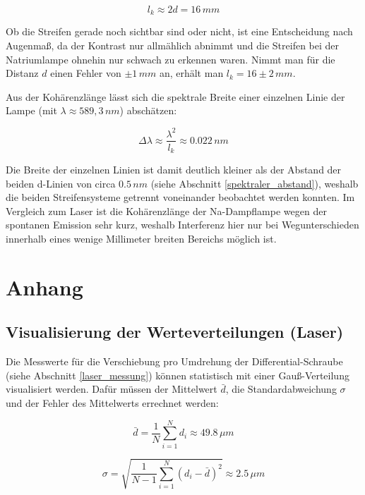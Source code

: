 \documentclass[
  headings=optiontotocandhead,
  twoside,
  openright,
  numbers=noenddot,
  toc=flat,
  11pt,
  parskip=full,
  listof=flat,
  bibliography=totoc,
  a4paper,
  DIV=14,
  BCOR=22mm,
  headheight=5mm,
  headinclude=true,
]{scrartcl}
\begin{document}
\begin{equation}
\label{eq:4.5.1}
l_k \approx 2d = 16 \, mm
\end{equation}
 
Ob die Streifen gerade noch sichtbar sind oder nicht, ist eine Entscheidung nach Augenmaß, da der Kontrast nur allmählich abnimmt und die Streifen bei der Natriumlampe ohnehin nur schwach zu erkennen waren. Nimmt man für die Distanz $d$ einen Fehler von $\pm 1 \,mm$ an, erhält man $l_k = 16 \pm 2 \,mm$.
 
Aus der Kohärenzlänge lässt sich die spektrale Breite einer einzelnen Linie der Lampe (mit $\lambda \approx 589{,}3 \,nm$) abschätzen:
 
\begin{equation}
\label{eq:4.5.2}
\Delta \lambda \approx \frac{\lambda^2}{l_k} \approx 0.022 \, nm
\end{equation}

Die Breite der einzelnen Linien ist damit deutlich kleiner als der Abstand der beiden d-Linien von circa $0.5 \,nm$ (siehe Abschnitt \ref{spektraler_abstand}), weshalb die beiden Streifensysteme getrennt voneinander beobachtet werden konnten. Im Vergleich zum Laser ist die Kohärenzlänge der Na-Dampflampe wegen der spontanen Emission sehr kurz, weshalb Interferenz hier nur bei Wegunterschieden innerhalb eines wenige Millimeter breiten Bereichs möglich ist.

\section{Anhang}

\subsection{Visualisierung der Werteverteilungen (Laser)} \label{gauss_visualisation}

Die Messwerte für die Verschiebung pro Umdrehung der Differential-Schraube (siehe Abschnitt \ref{laser_messung}) können statistisch mit einer Gauß-Verteilung visualisiert werden. Dafür müssen der Mittelwert $\bar{d}$, die Standardabweichung $\sigma$ und der Fehler des Mittelwerts errechnet werden:

\begin{equation}
  \bar{d} = \frac{1}{N} \sum_{i=1}^{N} d_i \approx 49.8 \, \mu m
  \label{eq:?.2}
\end{equation}

\begin{equation}
  \sigma = \sqrt{\frac{1}{N-1} \sum_{i=1}^{N} (d_i - \bar{d})^2} \approx 2.5 \, \mu m
  \label{eq:?.1}
\end{equation}
\end{document}
